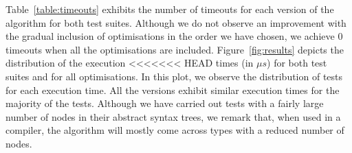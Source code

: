 Table~\ref{table:timeouts} 
exhibits the number of timeouts for each version of the algorithm for both
test suites. 
Although we do not observe an improvement with the gradual
inclusion of optimisations in the order we have chosen,
we achieve 0 timeouts when all the optimisations are included.
%
%
%
Figure~\ref{fig:results} depicts the distribution of the execution
<<<<<<< HEAD
times (in $\mu s$) for both test suites and for all optimisations.  In
this plot, we observe the distribution of tests for each execution
time.  All the versions exhibit similar execution times for the
majority of the tests.  Although we have carried out tests with a
fairly large number of nodes in their abstract syntax trees, we remark
that, when used in a compiler, the algorithm will mostly come across
types with a reduced number of nodes.

